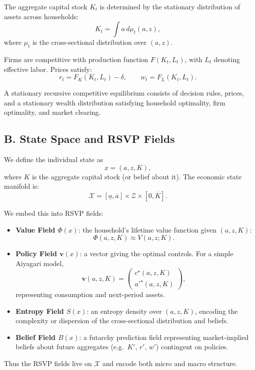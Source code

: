 \documentclass[12pt]{article}
\begin{document}
The aggregate capital stock $K_t$ is determined by the stationary
distribution of assets across households:
\[
K_t = \int a\, d\mu_t(a,z),
\]
where $\mu_t$ is the cross-sectional distribution over $(a,z)$.

Firms are competitive with production function $F(K_t,L_t)$, with
$L_t$ denoting effective labor. Prices satisfy:
\[
r_t = F_K(K_t,L_t) - \delta,\qquad
w_t = F_L(K_t,L_t).
\]

A stationary recursive competitive equilibrium consists of decision
rules, prices, and a stationary wealth distribution satisfying household
optimality, firm optimality, and market clearing.

\subsection*{B. State Space and RSVP Fields}

We define the individual state as
\[
x = (a,z,K),
\]
where $K$ is the aggregate capital stock (or belief about it). The
economic state manifold is:
\[
\mathcal{X} = [\underline{a},\overline{a}] \times \mathcal{Z} \times [0,\overline{K}].
\]

We embed this into RSVP fields:
\begin{itemize}
    \item \textbf{Value Field $\Phi(x)$}: the household’s lifetime value
    function given $(a,z,K)$:
    \[
    \Phi(a,z,K) \approx V(a,z;K).
    \]
    \item \textbf{Policy Field $\mathbf{v}(x)$}: a vector giving the
    optimal controls. For a simple Aiyagari model,
    \[
    \mathbf{v}(a,z,K) = 
    \begin{pmatrix}
        c^\star(a,z,K) \\
        a'^\star(a,z,K)
    \end{pmatrix},
    \]
    representing consumption and next-period assets.
    \item \textbf{Entropy Field $S(x)$}: an entropy density over
    $(a,z,K)$, encoding the complexity or dispersion of the
    cross-sectional distribution and beliefs.
    \item \textbf{Belief Field $B(x)$}: a futarchy prediction field
    representing market-implied beliefs about future aggregates
    (e.g.\ $K'$, $r'$, $w'$) contingent on policies.
\end{itemize}

Thus the RSVP fields live on $\mathcal{X}$ and encode both micro and
macro structure.
\end{document}
